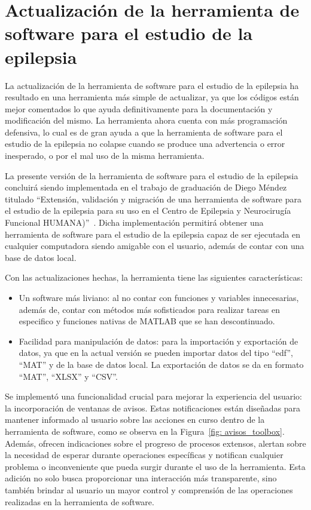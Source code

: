 \chapter{Actualización de la herramienta de software para el estudio de la epilepsia}
La actualización de la herramienta de software para el estudio de la epilepsia ha resultado en una herramienta más simple de actualizar, ya que los códigos están mejor comentados lo que ayuda definitivamente para la documentación y modificación del mismo. La herramienta ahora cuenta con más programación defensiva, lo cual es de gran ayuda a que la herramienta de software para el estudio de la epilepsia no colapse cuando se produce una advertencia o error inesperado, o por el mal uso de la misma herramienta.

La presente versión de la herramienta de software para el estudio de la epilepsia concluirá siendo implementada en el trabajo de graduación de Diego Méndez titulado ``Extensión, validación y migración de una herramienta de software para el estudio de la epilepsia para su uso en el Centro de Epilepsia y Neurocirugía Funcional HUMANA)''~\cite{diego_2023}. Dicha implementación permitirá obtener una herramienta de software para el estudio de la epilepsia capaz de ser ejecutada en cualquier computadora siendo amigable con el usuario, además de contar con una base de datos local.  

Con las actualizaciones hechas, la herramienta tiene las siguientes características:
\begin{itemize}
    \item Un software más liviano: al no contar con funciones y variables innecesarias, además de, contar con métodos más sofisticados para realizar tareas en especifico y funciones nativas de MATLAB que se han descontinuado. 
    \item Facilidad para manipulación de datos: para la importación y exportación de datos, ya que en la actual versión se pueden importar datos del tipo ``edf'', ``MAT'' y de la base de datos local. La exportación de datos se da en formato ``MAT'', ``XLSX'' y ``CSV''.
\end{itemize}

Se implementó una funcionalidad crucial para mejorar la experiencia del usuario: la incorporación de ventanas de avisos. Estas notificaciones están diseñadas para mantener informado al usuario sobre las acciones en curso dentro de la herramienta de software, como se observa en la Figura~\ref{fig: avisos_toolbox}. Además, ofrecen indicaciones sobre el progreso de procesos extensos, alertan sobre la necesidad de esperar durante operaciones específicas y notifican cualquier problema o inconveniente que pueda surgir durante el uso de la herramienta. Esta adición no solo busca proporcionar una interacción más transparente, sino también brindar al usuario un mayor control y comprensión de las operaciones realizadas en la herramienta de software.

